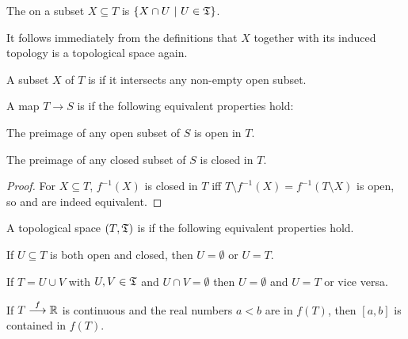 \documentclass[a4paper,parskip=half,numbers=enddot, DIV=12]{scrreprt}
\begin{document}
	\begin{defi}
		The  on a subset $X\subseteq T$ is $\left\{X\cap U\ \middle|\  U\in\mathfrak{T}\right\}$.
	\end{defi}
	\begin{rem}
		It follows immediately from the definitions that $X$ together with its induced topology is a topological space again.
	\end{rem}
	\begin{defi}
		A subset $X$ of $T$ is  if it intersects any non-empty open subset.
	\end{defi}
	\begin{defi}
		A map $T\to S$ is  if the following equivalent properties hold:
		\begin{alphanumerate}
			\item The preimage of any open subset of $S$ is open in $T$.
			\item The preimage of any closed subset of $S$ is closed in $T$.
		\end{alphanumerate}
	\end{defi}
	\begin{proof}
		For $X\subseteq T$, $f^{-1}(X)$ is closed in $T$ iff $T\setminus f^{-1}(X)=f^{-1}(T\setminus X)$ is open, so  and  are indeed equivalent.
	\end{proof}
	 \begin{defi}\lbl{def:connected}
	 	A topological space $(T,\mathfrak{T})$ is  if the following equivalent properties hold.
	 	\begin{alphanumerate}
	 		\item If $U\subseteq T$ is both open and closed, then $U = \emptyset$ or $U=T$. 
	 		\item If $T=U\cup V$ with $U,V\in\mathfrak{T}$ and $U\cap V=\emptyset$ then $U=\emptyset$ and $U= T$ or vice versa.
	 		\item If $T\morphism[f] \IR$ is continuous and the real numbers $a<b$ are in $f(T)$, then $[a,b]$ is contained in $f(T)$.
	 	\end{alphanumerate}
	 \end{defi}
\end{document}
